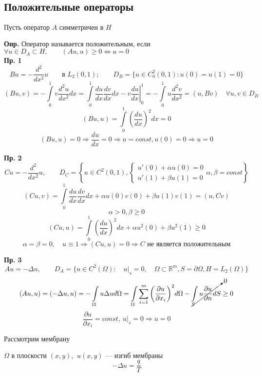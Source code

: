 \documentclass[12pt, a4paper]{article}
\begin{document}
\subsection{Положительные операторы}

Пусть оператор $A$ симметричен в $H$

\textbf{Опр.} Оператор называется положительным, если $ \forall u \in D_A \subset H, \qquad (Au, u) \geq 0 \Leftrightarrow u = 0 $ \\

\textbf{Пр. 1}
\[Bu = -\frac{ d^2 }{d x^2 }u \qquad \textrm{в } L_2 (0,1); \qquad D_B = \{u \in C^2_0 (0,1): u(0) = u(1) = 0\} \]
\[ (B u, v) = - \int\limits_{0}^{1} v  \frac{d^2 u }{d x^2} dx = \int\limits_{0}^{1} \frac{du }{dx} \frac{d v }{d x } dx - v \left.\frac{d u }{dx }\right|^1_0 = - \int\limits_{0}^{1} u \frac{d^2v }{dx^2 } = (u, Bv) \quad \forall u,v \in D_B \]
\[ (Bu, u) = \int\limits_{0}^{1} {\left(\frac{du }{dx }\right)}^2 dx = 0 \]
\[ (Bu, u) = 0 \Rightarrow \frac{du }{dx } = 0 \Rightarrow u = const, u(0) = 0 \Rightarrow u = 0 \]

\textbf{Пр. 2}
\[ Cu = - \frac{ d^2 }{dx^2 }u, \qquad D_C = \left\{ u \in C^2(0,1),
	\begin{cases}
		u'(0)+\alpha u(0)=0 \\
		u'(1)+\beta u(1)=0
	\end{cases}
	\alpha, \beta = const
\right\}
\]
\[(Cu, v) = \int\limits_{0}^{1} \frac{du}{dx} \frac{dv}{dx} dx + \alpha u(0)v(0) + \beta u(1)v(1) = (u, Cv)\]
\[\alpha > 0, \beta \geq 0\]
\[(Cu, u) = \int\limits_{0}^{1} {\left(\frac{du}{dx}\right)}^2 dx + \alpha u^2(0) + \beta u^2(1) \geq 0\]
\[\alpha = \beta = 0, \quad u \equiv 1 \Rightarrow (Cu, u) = 0 \Rightarrow C \text{ не является положительным}\]

\textbf{Пр. 3}
\[ Au = - \Delta u , \qquad D_A = \{ u \in C^2(\Omega): \quad u|_s = 0, \quad \Omega \subset \mathbb{R}^m, S = \partial \Omega, H = L_2(\Omega) \} \]
\[ (Au, u) = (-\Delta u, u ) = - \int\limits_{\Omega }^{} u \Delta u d \Omega = \int\limits_{\Omega }^{} \sum_{i = 1}^{m } {\left(\frac{\partial u }{\partial x_i }\right)}^2 d\Omega - \cancelto{0}{\int\limits_{S }^{} u \frac{\partial u }{\partial n } dS}  \geq 0 \]
\[ \frac{\partial u }{\partial x_i } = const, \ u|_s = 0 \Rightarrow u = 0 \]

\newpage

Рассмотрим мембрану

$\Omega$ в плоскости $(x,y)$, $\ u(x,y)$ --- изгиб мембраны
\[ - \Delta u = \frac{q}{T} \]
\end{document}
